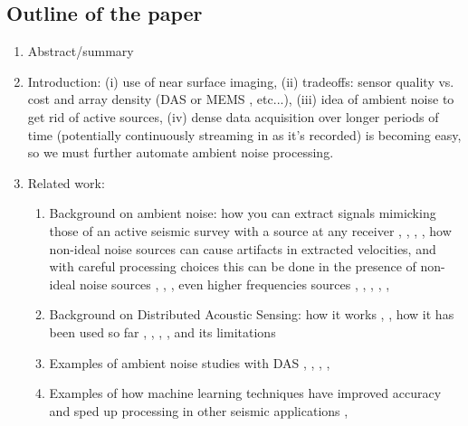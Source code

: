 \documentclass[11pt]{article}
\begin{document}
\subsection*{Outline of the paper}
	\begin{enumerate}
	\vspace{-0.2cm}
	\item Abstract/summary
	\vspace{-0.3cm}
	\item Introduction: (i) use of near surface imaging, (ii) tradeoffs: sensor quality vs. cost and array density (DAS or MEMS \cite{Evans2014}, etc...), (iii) idea of ambient noise to get rid of active sources, (iv) dense data acquisition over longer periods of time (potentially continuously streaming in as it's recorded) is becoming easy, so we must further automate ambient noise processing.
	\vspace{-0.3cm}
	\item Related work:
		\begin{enumerate}
		\vspace{-0.3cm}
		\item Background on ambient noise: how you can extract signals mimicking those of an active seismic survey with a source at any receiver \cite{Lobkis2001}, \cite{Lin2008}, \cite{Wapenaar2010A}, \cite{Wapenaar2010B}, how non-ideal noise sources can cause artifacts in extracted velocities, and with careful processing choices this can be done in the presence of non-ideal noise sources \cite{Bensen2007}, \cite{Daskalakis2016}, \cite{Zhan2013}, even higher frequencies sources \cite{Girard2016}, \cite{Martin2015}, \cite{Martin2016}, \cite{Nakata2011}, \cite{Nakata2015}, \cite{Zeng2017}
		\vspace{-0.1cm}
		\item Background on Distributed Acoustic Sensing: how it works \cite{Bakku2015}, \cite{Posey2000}, how it has been used so far \cite{Bakku2015}, \cite{Daley2013}, \cite{Webster2013}, \cite{Mateeva2014}, and its limitations \cite{Kuvshinov2016}
		\vspace{-0.1cm}
		\item Examples of ambient noise studies with DAS \cite{AjoFranklin2015}, \cite{Martin2015}, \cite{Martin2016}, \cite{Martin2017}, \cite{Zeng2017}
		\vspace{-0.1cm}
		\item Examples of how machine learning techniques have improved accuracy and sped up processing in other seismic applications \cite{Fisher2016}, \cite{Yoon2015}
		\end{enumerate}

\end{enumerate}
\end{document}
